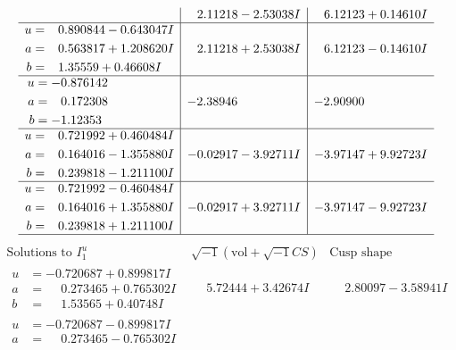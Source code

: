 \documentclass[1p]{elsarticle_modified}
\theoremstyle{definition}
\newcommand{\I}{\sqrt{-1}}
\begin{document}
$$\begin{array}{c|c|c}
 & \phantom{-}2.11218 - 2.53038 I & \phantom{-}6.12123 + 0.14610 I \\ \hline\begin{aligned}
u &= \phantom{-}0.890844 - 0.643047 I \\
a &= \phantom{-}0.563817 + 1.208620 I \\
b &= \phantom{-}1.35559 + 0.46608 I\end{aligned}
 & \phantom{-}2.11218 + 2.53038 I & \phantom{-}6.12123 - 0.14610 I \\ \hline\begin{aligned}
u &= -0.876142\phantom{ +0.000000I} \\
a &= \phantom{-}0.172308\phantom{ +0.000000I} \\
b &= -1.12353\phantom{ +0.000000I}\end{aligned}
 & -2.38946\phantom{ +0.000000I} & -2.90900\phantom{ +0.000000I} \\ \hline\begin{aligned}
u &= \phantom{-}0.721992 + 0.460484 I \\
a &= \phantom{-}0.164016 - 1.355880 I \\
b &= \phantom{-}0.239818 - 1.211100 I\end{aligned}
 & -0.02917 - 3.92711 I & -3.97147 + 9.92723 I \\ \hline\begin{aligned}
u &= \phantom{-}0.721992 - 0.460484 I \\
a &= \phantom{-}0.164016 + 1.355880 I \\
b &= \phantom{-}0.239818 + 1.211100 I\end{aligned}
 & -0.02917 + 3.92711 I & -3.97147 - 9.92723 I\\
 \hline 
 \end{array}$$\newpage$$\begin{array}{c|c|c}  
\text{Solutions to }I^u_{1}& \I (\text{vol} + \sqrt{-1}CS) & \text{Cusp shape}\\
 \hline 
\begin{aligned}
u &= -0.720687 + 0.899817 I \\
a &= \phantom{-}0.273465 + 0.765302 I \\
b &= \phantom{-}1.53565 + 0.40748 I\end{aligned}
 & \phantom{-}5.72444 + 3.42674 I & \phantom{-}2.80097 - 3.58941 I \\ \hline\begin{aligned}
u &= -0.720687 - 0.899817 I \\
a &= \phantom{-}0.273465 - 0.765302 I \\

\end{aligned}
\end{array}$$
\end{document}
